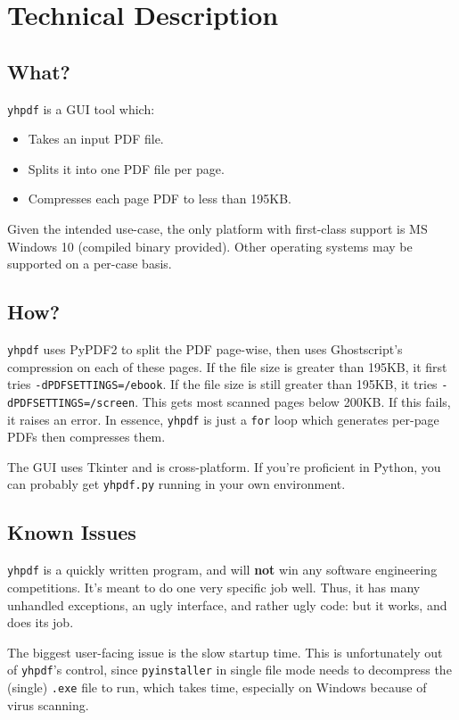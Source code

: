 \documentclass[9pt]{report}
\begin{document}
\chapter{Technical Description}
\label{sec:org7db3a22}
\section{What?}
\label{sec:org73dedb4}
\texttt{yhpdf} is a GUI tool which:
\begin{itemize}
\item Takes an input PDF file.
\item Splits it into one PDF file per page.
\item Compresses each page PDF to less than 195KB.
\end{itemize}

Given the intended use-case, the only platform with first-class
support is MS Windows 10 (compiled binary provided). Other operating
systems may be supported on a per-case basis.

\section{How?}
\label{sec:org57cdb7e}
\texttt{yhpdf} uses PyPDF2 to split the PDF page-wise, then uses
Ghostscript's compression on each of these pages. If the file size
is greater than 195KB, it first tries \texttt{-dPDFSETTINGS=/ebook}. If
the file size is still greater than 195KB, it tries
\texttt{-dPDFSETTINGS=/screen}. This gets most scanned pages below 200KB.
If this fails, it raises an error. In essence, \texttt{yhpdf} is just a
\texttt{for} loop which generates per-page PDFs then compresses them.

The GUI uses Tkinter and is cross-platform. If you're proficient in
Python, you can probably get \texttt{yhpdf.py} running in your own
environment.

\section{Known Issues}
\label{sec:org95f3f6d}
\texttt{yhpdf} is a quickly written program, and will \textbf{not} win any
software engineering competitions. It's meant to do one very
specific job well. Thus, it has many unhandled exceptions, an ugly
interface, and rather ugly code: but it works, and does its job.

The biggest user-facing issue is the slow startup time. This is
unfortunately out of \texttt{yhpdf}'s control, since \texttt{pyinstaller} in
single file mode needs to decompress the (single) \texttt{.exe} file to
run, which takes time, especially on Windows because of virus
scanning.
\end{document}
